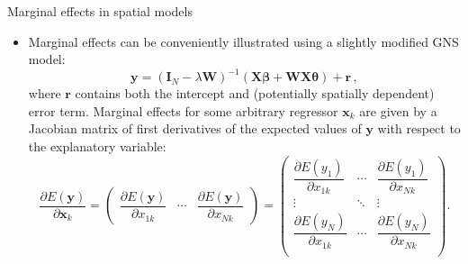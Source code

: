 \documentclass{beamer}
\begin{document}
\begin{frame}{Marginal effects in spatial models}
\begin{itemize}
	\item Marginal effects can be conveniently illustrated using a slightly modified GNS model:
\begin{equation*}
\bm{y} = (\bm{I}_N - \lambda \bm{W})^{-1}
         (\bm{X \beta}+\bm{WX\theta}) + \bm{r} \,,
\end{equation*}
where $\bm{r}$ contains both the intercept and (potentially spatially dependent) error term. Marginal effects for some arbitrary regressor $\bm{x}_k$ are given by a Jacobian matrix of first derivatives of the expected values of $\bm{y}$ with respect to the explanatory variable: 
\begin{equation*}
\frac{\partial E(\bm{y})}{\partial \bm{x}_k} = 
\begin{pmatrix}
		\dfrac{ \partial E(\bm{y})}{ \partial x_{1k}} & \cdots & \dfrac{\partial E(\bm{y})}{ \partial x_{Nk}}
	\end{pmatrix} = 	
	\begin{pmatrix}
		\dfrac{\partial E(y_{1})}{\partial x_{1k}} & \cdots & \dfrac{\partial E(y_{1})}{\partial x_{Nk}} \\
		\vdots & \ddots & \vdots \\
		\dfrac{\partial E(y_{N})}{\partial x_{1k}} &\cdots & \dfrac{\partial E(y_{N})}{\partial x_{Nk}} \\
	\end{pmatrix}.
\end{equation*}
\end{itemize}	
\end{frame}
\end{document}
